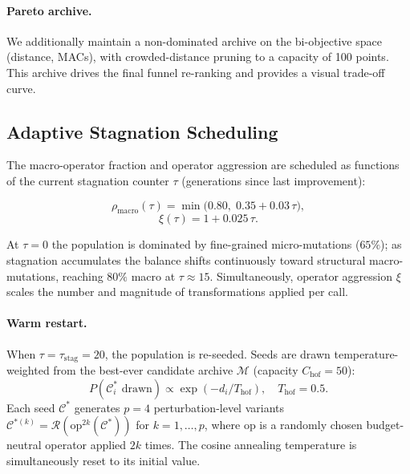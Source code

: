 \documentclass{article}
\newcommand{\Cc}{\mathcal{C}}
\newcommand{\Mc}{\mathcal{M}}
\begin{document}
\paragraph{Pareto archive.}  We additionally maintain a non-dominated
archive on the bi-objective space (distance, MACs), with crowded-distance
pruning to a capacity of 100 points.  This archive drives the final
funnel re-ranking and provides a visual trade-off curve.

\subsection{Adaptive Stagnation Scheduling}
\label{sec:schedule}

The macro-operator fraction and operator aggression are scheduled as
functions of the current stagnation counter $\tau$ (generations since
last improvement):

\begin{equation}
  \rho_{\mathrm{macro}}(\tau)
  = \min\bigl(0.80,\; 0.35 + 0.03\,\tau\bigr),
  \label{eq:macro_frac}
\end{equation}
\begin{equation}
  \xi(\tau) = 1 + 0.025\,\tau.
  \label{eq:aggression}
\end{equation}

At $\tau=0$ the population is dominated by fine-grained micro-mutations
($65\%$); as stagnation accumulates the balance shifts continuously
toward structural macro-mutations, reaching $80\%$ macro at
$\tau\approx 15$.  Simultaneously, operator aggression $\xi$ scales
the number and magnitude of transformations applied per call.

\paragraph{Warm restart.}
When $\tau=\tau_{\mathrm{stag}}=20$, the population is re-seeded.  Seeds
are drawn temperature-weighted from the best-ever candidate archive
$\Mc$ (capacity $C_{\mathrm{hof}}=50$):
\begin{equation}
  P(\Cc^*_i \text{ drawn})\propto\exp(-d_i/T_{\mathrm{hof}}),
  \quad T_{\mathrm{hof}}=0.5.
  \label{eq:hof_sample}
\end{equation}
Each seed $\Cc^*$ generates $p=4$ perturbation-level variants
$\Cc^{*(k)} = \mathcal{R}(\mathrm{op}^{2k}(\Cc^*))$ for
$k=1,\ldots,p$, where op is a randomly chosen budget-neutral operator
applied $2k$ times.  The cosine annealing temperature is simultaneously
reset to its initial value.
\end{document}
